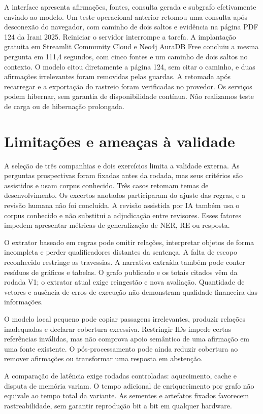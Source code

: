\documentclass[conference]{IEEEtran}
\begin{document}
A interface apresenta afirmações, fontes, consulta gerada e subgrafo efetivamente enviado ao modelo. Um teste operacional anterior retomou uma consulta após desconexão do navegador, com caminho de dois saltos e evidência na página PDF 124 da Irani 2025. Reiniciar o servidor interrompe a tarefa. A implantação gratuita em Streamlit Community Cloud e Neo4j AuraDB Free concluiu a mesma pergunta em 111,4 segundos, com cinco fontes e um caminho de dois saltos no contexto. O modelo citou diretamente a página 124, sem citar o caminho, e duas afirmações irrelevantes foram removidas pelas guardas. A retomada após recarregar e a exportação do rastreio foram verificadas no provedor. Os serviços podem hibernar, sem garantia de disponibilidade contínua. Não realizamos teste de carga ou de hibernação prolongada.

\section{Limitações e ameaças à validade}

A seleção de três companhias e dois exercícios limita a validade externa. As perguntas prospectivas foram fixadas antes da rodada, mas seus critérios são assistidos e usam corpus conhecido. Três casos retomam temas de desenvolvimento. Os excertos anotados participaram do ajuste das regras, e a revisão humana não foi concluída. A revisão assistida por IA também usa o corpus conhecido e não substitui a adjudicação entre revisores. Esses fatores impedem apresentar métricas de generalização de NER, RE ou resposta.

O extrator baseado em regras pode omitir relações, interpretar objetos de forma incompleta e perder qualificadores distantes da sentença. A falta de escopo reconhecido restringe as travessias. A narrativa extraída também pode conter resíduos de gráficos e tabelas. O grafo publicado e os totais citados vêm da rodada V1; o extrator atual exige reingestão e nova avaliação. Quantidade de vetores e ausência de erros de execução não demonstram qualidade financeira das informações.

O modelo local pequeno pode copiar passagens irrelevantes, produzir relações inadequadas e declarar cobertura excessiva. Restringir IDs impede certas referências inválidas, mas não comprova apoio semântico de uma afirmação em uma fonte existente. O pós-processamento pode ainda reduzir cobertura ao remover afirmações ou transformar uma resposta em abstenção.

A comparação de latência exige rodadas controladas: aquecimento, cache e disputa de memória variam. O tempo adicional de enriquecimento por grafo não equivale ao tempo total da variante. As sementes e artefatos fixados favorecem rastreabilidade, sem garantir reprodução bit a bit em qualquer hardware.
\end{document}
